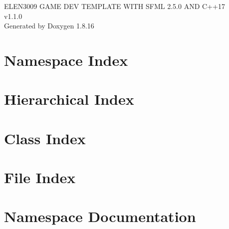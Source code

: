 \let\mypdfximage\pdfximage\def\pdfximage{\immediate\mypdfximage}\documentclass[twoside]{book}
\newcommand{\+}{\discretionary{\mbox{\scriptsize$\hookleftarrow$}}{}{}}
\newcommand{\clearemptydoublepage}{%
  \newpage{\pagestyle{empty}\cleardoublepage}%
}
\begin{document}
\hypersetup{pageanchor=false,
             bookmarksnumbered=true,
             pdfencoding=unicode
            }
\begin{titlepage}
\vspace*{7cm}
\begin{center}%
{\Large E\+L\+E\+N3009 G\+A\+ME D\+EV T\+E\+M\+P\+L\+A\+TE W\+I\+TH S\+F\+ML 2.5.0 A\+ND C++17 \\[1ex]\large v1.\+1.\+0 }\\
\vspace*{1cm}
{\large Generated by Doxygen 1.8.16}\\
\end{center}
\end{titlepage}
\clearemptydoublepage
{}
\tableofcontents
\clearemptydoublepage
{}
\hypersetup{pageanchor=true}

\chapter{Namespace Index}

\chapter{Hierarchical Index}

\chapter{Class Index}

\chapter{File Index}

\chapter{Namespace Documentation}




\end{document}
